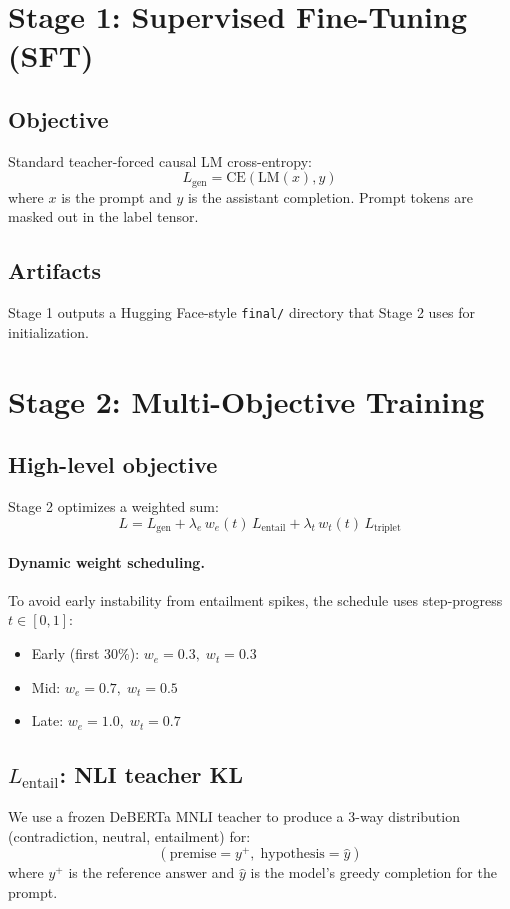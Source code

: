\documentclass[11pt]{article}
\begin{document}
\section{Stage 1: Supervised Fine-Tuning (SFT)}
\subsection{Objective}
Standard teacher-forced causal LM cross-entropy:
\[
L_{\text{gen}} = \text{CE}(\text{LM}(x), y)
\]
where $x$ is the prompt and $y$ is the assistant completion. Prompt tokens are masked out in the label tensor.

\subsection{Artifacts}
Stage 1 outputs a Hugging Face-style \texttt{final/} directory that Stage 2 uses for initialization.

\section{Stage 2: Multi-Objective Training}
\subsection{High-level objective}
Stage 2 optimizes a weighted sum:
\[
L = L_{\text{gen}} + \lambda_e \, w_e(t)\,L_{\text{entail}} + \lambda_t \, w_t(t)\,L_{\text{triplet}}
\]

\paragraph{Dynamic weight scheduling.}
To avoid early instability from entailment spikes, the schedule uses step-progress $t \in [0,1]$:
\begin{itemize}
  \item Early (first 30\%): $w_e=0.3,\; w_t=0.3$
  \item Mid: $w_e=0.7,\; w_t=0.5$
  \item Late: $w_e=1.0,\; w_t=0.7$
\end{itemize}

\subsection{$L_{\text{entail}}$: NLI teacher KL}
We use a frozen DeBERTa MNLI teacher to produce a 3-way distribution (contradiction, neutral, entailment) for:
\[
(\text{premise}=y^+,\; \text{hypothesis}=\hat{y})
\]
where $y^+$ is the reference answer and $\hat{y}$ is the model's greedy completion for the prompt.
\end{document}
